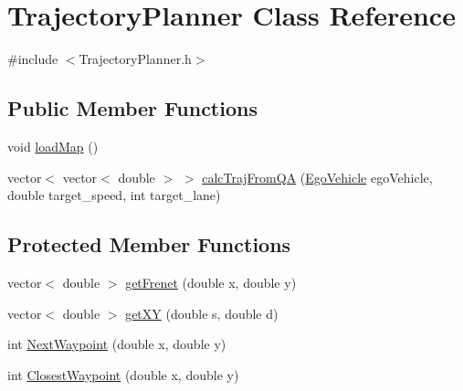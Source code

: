 \hypertarget{classTrajectoryPlanner}{}\section{Trajectory\+Planner Class Reference}
\label{classTrajectoryPlanner}


{\ttfamily \#include $<$Trajectory\+Planner.\+h$>$}

\subsection*{Public Member Functions}
\begin{DoxyCompactItemize}
\item 
void \hyperlink{classTrajectoryPlanner_ae59e35b4d9fce61283412ab099d94f66}{load\+Map} ()
\item 
vector$<$ vector$<$ double $>$ $>$ \hyperlink{classTrajectoryPlanner_a046a79f994d48d6ac2c5db82a9100512}{calc\+Traj\+From\+QA} (\hyperlink{classEgoVehicle}{Ego\+Vehicle} ego\+Vehicle, double target\+\_\+speed, int target\+\_\+lane)
\end{DoxyCompactItemize}
\subsection*{Protected Member Functions}
\begin{DoxyCompactItemize}
\item 
vector$<$ double $>$ \hyperlink{classTrajectoryPlanner_ae7510d0c40770043b10cc6e6d83a857c}{get\+Frenet} (double x, double y)
\item 
vector$<$ double $>$ \hyperlink{classTrajectoryPlanner_a8469f790a9a144901d1bf9d533865067}{get\+XY} (double s, double d)
\item 
int \hyperlink{classTrajectoryPlanner_a431693acbdb03af68dab2dff8fb236a3}{Next\+Waypoint} (double x, double y)
\item 
int \hyperlink{classTrajectoryPlanner_ad43e018e594d61eadae5e6bad49c4334}{Closest\+Waypoint} (double x, double y)
\end{DoxyCompactItemize}
